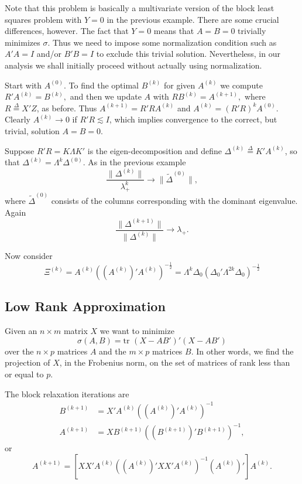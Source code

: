 \documentclass[
  12pt,
]{book}
\begin{document}
Note that this problem is basically a multivariate version of the block least squares problem with \(Y=0\) in the previous example.
There are some crucial differences, however. The fact that \(Y=0\) means
that \(A=B=0\) trivially minimizes \(\sigma\). Thus we need to impose some
normalization condition such as \(A'A=I\) and/or \(B'B=I\) to exclude this trivial solution. Nevertheless, in our analysis we shall initially proceed without actually using normalization.

Start with \(A^{(0)}\). To find the optimal \(B^{(k)}\) for given \(A^{(k)}\)
we compute \(R'A^{(k)}=B^{(k)},\)
and then we update \(A\) with \(RB^{(k)}=A^{(k+1)},\)
where \(R\mathop{=}\limits^{\Delta}X'Z\), as before. Thus \(A^{(k+1)}=R'RA^{(k)}\) and \(A^{(k)}=(R'R)^kA^{(0)}\). Clearly \(A^{(k)}\rightarrow 0\) if \(R'R\lesssim I\), which implies convergence to the correct, but trivial, solution \(A=B=0\).

Suppose \(R'R=K\Lambda K'\) is the eigen-decomposition and define \(\Delta^{(k)}\mathop{=}\limits^{\Delta}K'A^{(k)}\), so that \(\Delta^{(k)}=\Lambda^k\Delta^{(0)}.\) As in the previous example
\[
\frac{\|\Delta^{(k)}\|}{\lambda_+^k}\rightarrow\|\tilde\Delta^{(0)}\|,
\]
where \(\tilde\Delta^{(0)}\) consists of the columns corresponding with the dominant eigenvalue. Again
\[
\frac{\|\Delta^{(k+1)}\|}{\|\Delta^{(k)}\|}\rightarrow\lambda_+.
\]

Now consider \[\Xi^{(k)}=A^{(k)}((A^{(k)})'A^{(k)})^{-\frac12}=\Lambda^k\Delta_0(\Delta_0'\Lambda^{2k}\Delta_0)^{-\frac12}\]

\hypertarget{blockrelaxation:additionalexamples:lowrankapproximation}{%
\subsection{Low Rank Approximation}\label{blockrelaxation:additionalexamples:lowrankapproximation}}

Given an \(n\times m\) matrix \(X\) we want to minimize
\[
\sigma(A,B)=\text{tr }(X-AB')'(X-AB')
\]
over the \(n\times p\) matrices \(A\) and the \(m\times p\) matrices \(B\). In other words, we find the projection of \(X\), in the Frobenius norm, on the set of matrices of rank less than or equal to \(p\).

The block relaxation iterations are
\begin{align*}
B^{(k+1)}&=X'A^{(k)}((A^{(k)})'A^{(k)})^{-1}\\
A^{(k+1)}&=XB^{(k+1)}((B^{(k+1)})'B^{(k+1)})^{-1},
\end{align*}
or
\[
A^{(k+1)}=\left[XX'A^{(k)}((A^{(k)})'XX'A^{(k)})^{-1}
(A^{(k)})'\right]A^{(k)}.
\]
\end{document}

